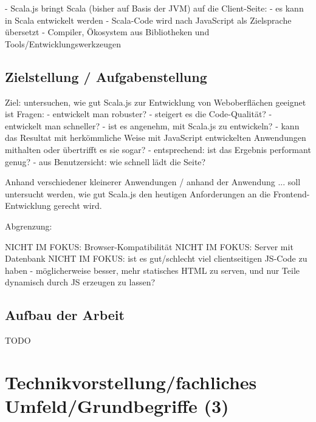 \documentclass[a4paper, 12pt, listof=totoc, bibliography=totoc]{scrreprt}
\begin{document}
- Scala.js bringt Scala (bisher auf Basis der JVM) auf die Client-Seite:
  - es kann in Scala entwickelt werden
  - Scala-Code wird nach JavaScript als Zielsprache übersetzt
  - Compiler, Ökosystem aus Bibliotheken und Tools/Entwicklungswerkzeugen



\section{Zielstellung / Aufgabenstellung}

Ziel: untersuchen, wie gut Scala.js zur Entwicklung von Weboberflächen geeignet ist
Fragen:
  - entwickelt man robuster?
  - steigert es die Code-Qualität?
  - entwickelt man schneller?
  - ist es angenehm, mit Scala.js zu entwickeln?
  - kann das Resultat mit herkömmliche Weise mit JavaScript entwickelten Anwendungen mithalten oder übertrifft es sie sogar?
  - entsprechend: ist das Ergebnis performant genug?
  - aus Benutzersicht: wie schnell lädt die Seite?

Anhand verschiedener kleinerer Anwendungen / anhand der Anwendung ... soll untersucht werden, wie gut Scala.js den heutigen Anforderungen an die Frontend-Entwicklung gerecht wird.


Abgrenzung:

	NICHT IM FOKUS: Browser-Kompatibilität
	NICHT IM FOKUS: Server mit Datenbank
	NICHT IM FOKUS:  ist es gut/schlecht viel clientseitigen JS-Code zu haben - möglicherweise besser, mehr statisches HTML zu serven, und nur Teile dynamisch durch JS erzeugen zu lassen?


\section{Aufbau der Arbeit}

TODO






















\chapter{Technikvorstellung/fachliches Umfeld/Grundbegriffe (3)}
\end{document}
